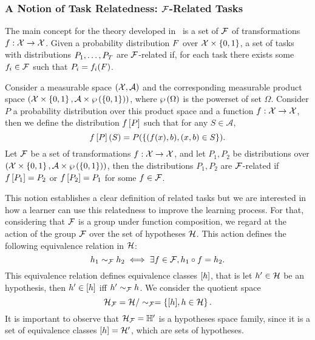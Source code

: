 \subsubsection*{A Notion of Task Relatedness: $\mathcal{F}$-Related Tasks}
The main concept for the theory developed in~\cite{Ben-DavidB08} is a set of $\mathcal{F}$ of transformations $f: \mathcal{X} \to \mathcal{X}$. Given a probability distribution $F$ over $\mathcal{X} \times \left\{0, 1\right\}$, a set of tasks with distributions $P_1, \ldots, P_T$ are $\mathcal{F}$-related if, for each task there exists some $f_i \in \mathcal{F}$ such that $P_i = f_i(F)$.

\begin{definition}\label{def:frel_tasks}
    Consider a measurable space $(\mathcal{X}, \mathcal{A})$ and the corresponding measurable product space $(\mathcal{X} \times \left\{0, 1\right\}, \mathcal{A} \times \wp\left( \left\{0, 1\right\} \right))$, where $\wp\left( \Omega \right)$ is the powerset of set $\Omega$. Consider $P$ a probability distribution over this product space and a function $f: \mathcal{X} \to \mathcal{X}$, then we define the distribution $f\left[ P \right]$ such that for any $S \in \mathcal{A}$,
    $$ f\left[ P \right](S) = P(\left\{(f(x), b), (x, b) \in S \right\}).$$
    Let $\mathcal{F}$ be a set of transformations $f: \mathcal{X} \to \mathcal{X}$, and let $P_1, P_2$ be distributions over $(\mathcal{X} \times \left\{0, 1\right\}, \mathcal{A} \times \wp\left( \left\{0, 1\right\} \right))$, then the distributions $P_1, P_2$ are $\mathcal{F}$-related if $f\left[ P_1 \right]= P_2$ or $f\left[ P_2 \right] = P_1$ for some $f \in \mathcal{F}$.
\end{definition}
This notion establishes a clear definition of related tasks but we are interested in how a learner can use this relatedness to improve the learning process.
For that, considering that $\mathcal{F}$ is a group under function composition, we regard at the action of the group $\mathcal{F}$ over the set of hypotheses $\mathcal{H}$. This action defines the following equivalence relation in $\mathcal{H}$:
$$ h_1 \sim_{\mathcal{F}} h_2 \iff \exists f \in \mathcal{F},  h_1 \circ f = h_2 .$$
%
This equivalence relation defines equivalence classes $\lbrack h\rbrack$, that is let $h' \in \mathcal{H}$ be an hypothesis, then $h' \in \lbrack h\rbrack$ iff $h' \sim_{\mathcal{F}} h$. 
We consider the quotient space 
$$\mathcal{H}_{\mathcal{F}} = \mathcal{H} / \sim_{\mathcal{F}} = \left\{\lbrack h\rbrack, h \in \mathcal{H}\right\}.$$
It is important to observe that $\mathcal{H}_{\mathcal{F}} = \mathbb{H}'$ is a hypotheses space family, since it is a set of equivalence classes $\lbrack h\rbrack = \mathcal{H}'$, which are sets of hypotheses.
%

